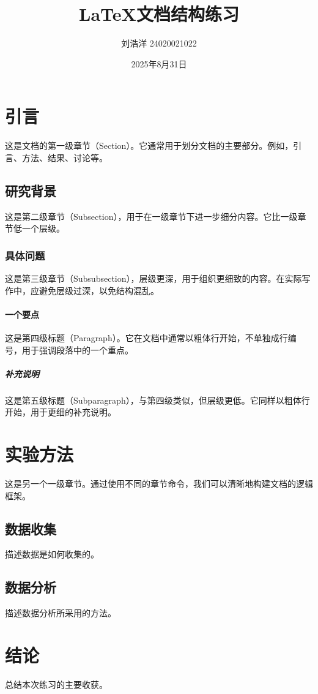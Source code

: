 \documentclass{article} %
\title{LaTeX文档结构练习}
\author{刘浩洋 24020021022}
\date{2025年8月31日}
\begin{document}
\maketitle %

\section{引言}
这是文档的第一级章节（Section）。它通常用于划分文档的主要部分。例如，引言、方法、结果、讨论等。

\subsection{研究背景}
这是第二级章节（Subsection），用于在一级章节下进一步细分内容。它比一级章节低一个层级。

\subsubsection{具体问题}
这是第三级章节（Subsubsection），层级更深，用于组织更细致的内容。在实际写作中，应避免层级过深，以免结构混乱。

\paragraph{一个要点}
这是第四级标题（Paragraph）。它在文档中通常以粗体行开始，不单独成行编号，用于强调段落中的一个重点。

\subparagraph{补充说明}
这是第五级标题（Subparagraph），与第四级类似，但层级更低。它同样以粗体行开始，用于更细的补充说明。

\section{实验方法}
这是另一个一级章节。通过使用不同的章节命令，我们可以清晰地构建文档的逻辑框架。

\subsection{数据收集}
描述数据是如何收集的。

\subsection{数据分析}
描述数据分析所采用的方法。

\section{结论}
总结本次练习的主要收获。
\end{document}
